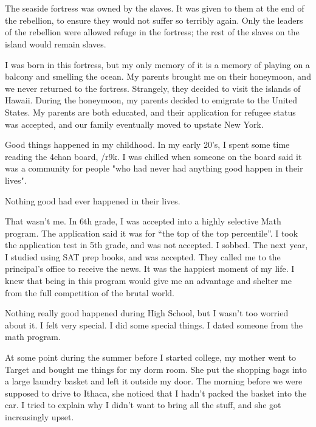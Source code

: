 \section{}

The seaside fortress was owned by the slaves.  It was given to them at the end
of the rebellion, to ensure they would not suffer so terribly again.  Only the
leaders of the rebellion were allowed refuge in the fortress; the rest of the
slaves on the island would remain slaves. 

I was born in this fortress, but my only memory of it is a memory of playing on
a balcony and smelling the ocean.  My parents brought me on their honeymoon, and
we never returned to the fortress.  Strangely, they decided to visit the islands
of Hawaii.  During the honeymoon, my parents decided to emigrate to the United
States.  My parents are both educated, and their application for refugee status
was accepted, and our family eventually moved to upstate New York.

Good things happened in my childhood.  In my early 20's, I spent some time
reading the 4chan board, /r9k.  I was chilled when someone on the board said it
was a community for people "who had never had anything good happen in their
lives".  

Nothing good had ever happened in their lives.

That wasn't me.  In 6th grade, I was accepted into a highly selective Math
program.  The application said it was for ``the top of the top percentile''.  I
took the application test in 5th grade, and was not accepted.  I sobbed.  The
next year, I studied using SAT prep books, and was accepted.  They called me to
the principal's office to receive the news.  It was the happiest moment of my
life.  I knew that being in this program would give me an advantage and shelter
me from the full competition of the brutal world.

Nothing really good happened during High School, but I wasn't too worried about
it.  I felt very special.  I did some special things.  I dated someone from the
math program.

At some point during the summer before I started college, my mother went to
Target and bought me things for my dorm room.  She put the shopping bags into a
large laundry basket and left it outside my door.  The morning before we were
supposed to drive to Ithaca, she noticed that I hadn't packed the basket into
the car.  I tried to explain why I didn't want to bring all the stuff, and she
got increasingly upset.

